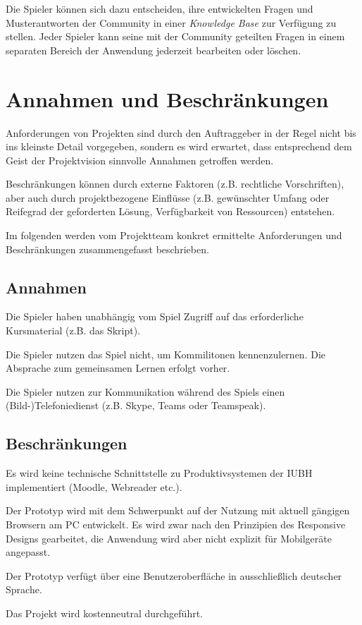 \documentclass[a4paper,11pt,listof=numbered,glossary=totoc,parskip=half,toc=bib]{scrreprt}
\begin{document}
Die Spieler können sich dazu entscheiden, ihre entwickelten Fragen und Musterantworten der Community in einer \textit{Knowledge Base} zur Verfügung zu stellen.
Jeder Spieler kann seine mit der Community geteilten Fragen in einem separaten Bereich der Anwendung jederzeit bearbeiten oder löschen.
	\newpage
	\section{Annahmen und Beschränkungen}
	Anforderungen von Projekten sind durch den Auftraggeber in der Regel nicht bis ins kleinste Detail vorgegeben, sondern es wird erwartet, dass entsprechend dem Geist der Projektvision sinnvolle Annahmen getroffen werden. 
	
	Beschränkungen können durch externe Faktoren (z.B. rechtliche Vorschriften), aber auch durch projektbezogene Einflüsse (z.B. gewünschter Umfang oder Reifegrad der geforderten Lösung, Verfügbarkeit von Ressourcen) entstehen.	
	
	Im folgenden werden vom Projektteam konkret ermittelte Anforderungen und Beschränkungen zusammengefasst beschrieben.
	
	\subsection{Annahmen}
Die Spieler haben unabhängig vom Spiel Zugriff auf das erforderliche Kursmaterial (z.B. das Skript).

Die Spieler nutzen das Spiel nicht, um Kommilitonen kennenzulernen. Die Absprache zum gemeinsamen Lernen erfolgt vorher.

Die Spieler nutzen zur Kommunikation während des Spiels einen (Bild-)Telefoniedienst (z.B. Skype, Teams oder Teamspeak).

\subsection{Beschränkungen}
Es wird keine technische Schnittstelle zu Produktivsystemen der IUBH implementiert (Moodle, Webreader etc.).

Der Prototyp wird mit dem Schwerpunkt auf der Nutzung mit aktuell gängigen Browsern am PC entwickelt. Es wird zwar nach den Prinzipien des Responsive Designs gearbeitet, die Anwendung wird aber nicht explizit für Mobilgeräte angepasst.

Der Prototyp verfügt über eine Benutzeroberfläche in ausschließlich deutscher Sprache.

Das Projekt wird kostenneutral durchgeführt.
\end{document}
